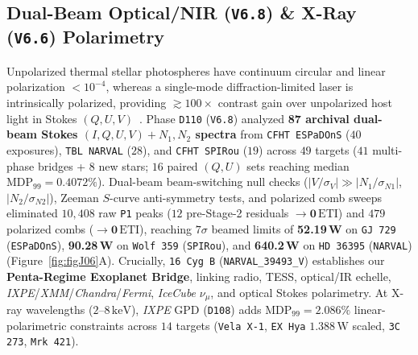 \documentclass[twocolumn,10pt]{article}
\begin{document}
\subsection{Dual-Beam Optical/NIR (\texttt{V6.8}) \& X-Ray (\texttt{V6.6}) Polarimetry}
Unpolarized thermal stellar photospheres have continuum circular and linear polarization $<10^{-4}$, whereas a single-mode diffraction-limited laser is intrinsically polarized, providing $\gtrsim 100\times$ contrast gain over unpolarized host light in Stokes $(Q,U,V)$~\cite{Donati1997,Cook2022}. Phase \texttt{D110} (\texttt{V6.8}) analyzed \textbf{87 archival dual-beam Stokes $(I,Q,U,V)+N_1,N_2$ spectra} from \texttt{CFHT ESPaDOnS} ($40$ exposures), \texttt{TBL NARVAL} ($28$), and \texttt{CFHT SPIRou} ($19$) across $49$ targets ($41$ multi-phase bridges + $8$ new stars; $16$ paired $(Q,U)$ sets reaching median $\mathrm{MDP}_{99} = 0.4072\%$). Dual-beam beam-switching null checks ($|V/\sigma_V| \gg |N_1/\sigma_{N1}|$, $|N_2/\sigma_{N2}|$), Zeeman $S$-curve anti-symmetry tests, and polarized comb sweeps eliminated $10{,}408$ raw \texttt{P1} peaks ($12$ pre-Stage-2 residuals $\rightarrow \mathbf{0\,\mathrm{ETI}}$) and $479$ polarized combs ($\rightarrow \mathbf{0\,\mathrm{ETI}}$), reaching $7\sigma$ beamed limits of \textbf{52.19\,W} on \texttt{GJ\,729} (\texttt{ESPaDOnS}), \textbf{90.28\,W} on \texttt{Wolf\,359} (\texttt{SPIRou}), and \textbf{640.2\,W} on \texttt{HD\,36395} (\texttt{NARVAL}) (Figure~\ref{fig:figJ06}A). Crucially, \texttt{16\,Cyg\,B} (\texttt{NARVAL\_39493\_V}) establishes our \textbf{Penta-Regime Exoplanet Bridge}, linking radio, TESS, optical/IR echelle, \textit{IXPE}/\textit{XMM}/\textit{Chandra}/\textit{Fermi}, \textit{IceCube} $\nu_\mu$, and optical Stokes polarimetry. At X-ray wavelengths ($2\text{--}8\,\mathrm{keV}$), \textit{IXPE} GPD (\texttt{D108}) adds $\mathrm{MDP}_{99} = 2.086\%$ linear-polarimetric constraints across $14$ targets (\texttt{Vela\,X-1}, \texttt{EX\,Hya} $1.388\,\mathrm{W}$ scaled, \texttt{3C\,273}, \texttt{Mrk\,421}).
\end{document}

